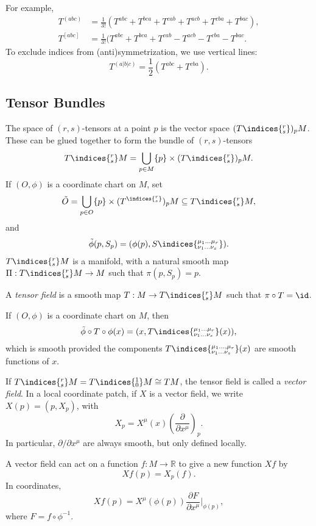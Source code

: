 \documentclass[12pt]{article}
\begin{document}
For example,
\begin{align*}
	T^{(abc)} &= \frac{1}{3!} (T^{abc} + T^{bca} + T^{cab} + T^{acb} + T^{cba} + T^{bac}), \\
	T^{[abc]} &= \frac{1}{3!} (T^{abc} + T^{bca} + T^{cab} - T^{acb} - T^{cba} - T^{bac}.
\end{align*}
To exclude indices from (anti)symmetrization, we use vertical lines:
\[
T^{(a|b|c)} = \frac{1}{2} (T^{abc} + T^{c b a}).
\]
\subsection{Tensor Bundles}%
\label{sub:tense_buns}

The space of $(r, s)$-tensors at a point $p$ is the vector space $(T\indices{^{r}_{s}})_pM$. These can be glued together to form the bundle of $(r, s)$-tensors
\[
	T\indices{^{r}_{s}} M = \bigcup_{p \in M}\{ p\} \times (T\indices{^{r}_{s}} )_p M.
\]
If $(O, \phi)$ is a coordinate chart on $M$, set
\[
	\tilde O = \bigcup_{p \in O} \{p\} \times (T^{\indices{^{r}_{s}}})_p M \subseteq T\indices{^{r}_{s}}M,
\]
and
\[
\tilde \phi(p, S_p) = (\phi(p), S\indices{^{\mu_1 \ldots \mu_r}_{\nu_1 \ldots \nu_s}} ).
\]
$T\indices{^{r}_{s}} M$ is a manifold, with a natural smooth map $\Pi : T\indices{^{r}_{s}}M \to M$ such that $\pi(p, S_p) = p$.

A \emph{tensor field} is a smooth map $T : M \to T\indices{^{r}_{s}}M$ such that $\pi \circ T = \id$.

If $(O, \phi)$ is a coordinate chart on $M$, then
\[
\tilde \phi \circ T \circ \phi(x) = (x, T\indices{^{\mu_1 \ldots \mu_r}_{ \nu_1 \ldots \nu_s}}(x)),
\]
which is smooth provided the components $T\indices{^{\mu_1 \ldots, \mu_r}_{ \nu_1 \ldots \nu_s}}(x)$ are smooth functions of $x$.

\begin{exbox}
	If $T\indices{^{r}_{s}} M = T\indices{^{1}_{0}}M \cong TM$, the tensor field is called a \emph{vector field}. In a local coordinate patch, if $X$ is a vector field, we write $X(p) = (p, X_p)$, with
	\[
	X_p = X^\mu(x) \left( \frac{\partial}{\partial x^\mu} \right)_p.
	\]
	In particular, $\partial / \partial x^\mu$ are always smooth, but only defined locally.
\end{exbox}


A vector field can act on a function $f : M \to \mathbb{R}$ to give a new function $Xf$ by
\[
Xf(p) = X_p(f).
\]
In coordinates,
\[
Xf(p) = X^\mu(\phi(p)) \frac{\partial F}{\partial x^\mu} \biggr|_{\phi(p)},
\]
where $F = f \circ \phi^{-1}$.
\end{document}
